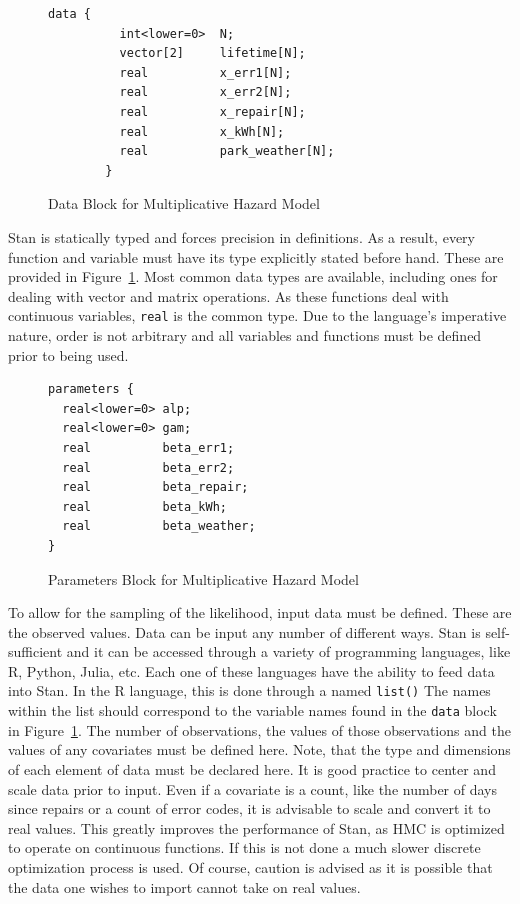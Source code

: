\begin{figure}[htbp]
    \centering
    \begin{lstlisting}[belowskip=-2 \baselineskip]
        data {
          int<lower=0>  N;
          vector[2]     lifetime[N];
          real          x_err1[N];
          real          x_err2[N];
          real          x_repair[N];
          real          x_kWh[N];
          real          park_weather[N];
        }\end{lstlisting}
    \caption{Data Block for Multiplicative Hazard Model}
    \label{mhaz_data}
\end{figure}

Stan is statically typed and forces precision in definitions. As a result, every function and variable must have its type explicitly stated before hand. These are provided in Figure~\ref{mhaz_data}. Most common data types are available, including ones for dealing with vector and matrix operations. As these functions deal with continuous variables, \lstinline{real} is the common type. Due to the language's imperative nature, order is not arbitrary and all variables and functions must be defined prior to being used. 




\begin{figure}[htbp]
    \centering
    \begin{lstlisting}[belowskip=-2 \baselineskip]
parameters {
  real<lower=0> alp;
  real<lower=0> gam;
  real          beta_err1;
  real          beta_err2;
  real          beta_repair;
  real          beta_kWh;
  real          beta_weather;
}\end{lstlisting}
    \caption{Parameters Block for Multiplicative Hazard Model}
    \label{mhaz_params}
\end{figure}

To allow for the sampling of the likelihood, input data must be defined. These are the observed values. Data can be input any number of different ways. Stan is self-sufficient and it can be accessed through a variety of programming languages, like R, Python, Julia, etc. Each one of these languages have the ability to feed data into Stan. In the R language, this is done through a named \lstinline{list()} The names within the list should correspond to the variable names found in the \lstinline{data} block in Figure~\ref{mhaz_data}. The number of observations, the values of those observations and the values of any covariates must be defined here. Note, that the type and dimensions of each element of data must be declared here. It is good practice to center and scale data prior to input. Even if a covariate is a count, like the number of days since repairs or a count of error codes, it is advisable to scale and convert it to real values. This greatly improves the performance of Stan, as HMC is optimized to operate on continuous functions. If this is not done a much slower discrete optimization process is used. Of course, caution is advised as it is possible that the data one wishes to import cannot take on real values. 





